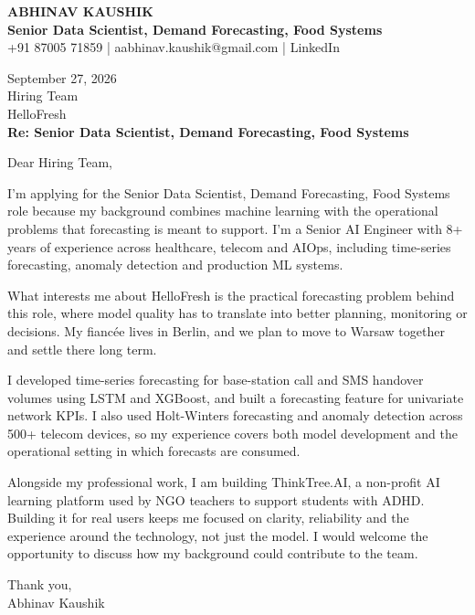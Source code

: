 \documentclass[10pt,a4paper]{article}
\begin{document}
\begin{center}
{\Large\bfseries ABHINAV KAUSHIK}\\[2pt]
{\bfseries Senior Data Scientist, Demand Forecasting, Food Systems}\\[2pt]
+91 87005 71859 \quad | \quad aabhinav.kaushik@gmail.com \quad | \quad LinkedIn
\end{center}
\vspace{8pt}
September 27, 2026\\[6pt]
Hiring Team\\
HelloFresh\\[4pt]
\textbf{Re: Senior Data Scientist, Demand Forecasting, Food Systems}

Dear Hiring Team,

I’m applying for the Senior Data Scientist, Demand Forecasting, Food Systems role because my background combines machine learning with the operational problems that forecasting is meant to support. I’m a Senior AI Engineer with 8+ years of experience across healthcare, telecom and AIOps, including time-series forecasting, anomaly detection and production ML systems.

What interests me about HelloFresh is the practical forecasting problem behind this role, where model quality has to translate into better planning, monitoring or decisions. My fiancée lives in Berlin, and we plan to move to Warsaw together and settle there long term.

I developed time-series forecasting for base-station call and SMS handover volumes using LSTM and XGBoost, and built a forecasting feature for univariate network KPIs. I also used Holt-Winters forecasting and anomaly detection across 500+ telecom devices, so my experience covers both model development and the operational setting in which forecasts are consumed.

Alongside my professional work, I am building ThinkTree.AI, a non-profit AI learning platform used by NGO teachers to support students with ADHD. Building it for real users keeps me focused on clarity, reliability and the experience around the technology, not just the model. I would welcome the opportunity to discuss how my background could contribute to the team.

Thank you,\\
Abhinav Kaushik
\end{document}
